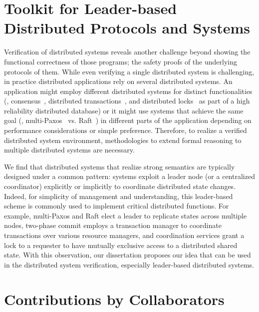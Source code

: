 \section{Toolkit for Leader-based Distributed Protocols and Systems}
\label{chapter:introduction:sec:toolkit-for-leader-based-distributed-protocols-and-systems}


Verification of distributed systems reveals another challenge beyond showing the functional correctness of those programs; the safety proofs of the underlying protocols of them. 
While even verifying a single distributed system is challenging, in practice
distributed applications rely on several distributed systems. An application
might employ different distributed systems for distinct functionalities (\eg,
consensus~\cite{vivaladifference}, distributed transactions~\cite{gray:2006},
and distributed locks~\cite{chubby, zookeeper} as part of a high reliability
distributed database) or it might use systems that achieve the same goal (\eg,
multi-Paxos~\cite{paxosmadesimple, rvrpaxos} vs. Raft~\cite{raft}) in different
parts of the application depending on performance considerations or simple
preference. Therefore, to realize a verified distributed system environment,
methodologies to extend formal reasoning to multiple distributed systems are
necessary.

We find that distributed systems that realize strong semantics are typically
designed under a common pattern: systems exploit a leader node
(or a centralized coordinator) explicitly or implicitly to coordinate
distributed state changes. Indeed, for simplicity of management and understanding, this leader-based scheme is commonly used to implement critical distributed functions. For example, multi-Paxos and Raft elect a leader to replicate states
across multiple nodes, two-phase commit employs a transaction manager to
coordinate transactions over various resource managers, and coordination
services grant a lock to a requester to have mutually exclusive access to a
distributed shared state.
With this observation, our dissertation proposes our idea that can be used in the distributed system verification,
especially leader-based distributed systems.

\section{Contributions by Collaborators}
\label{chapter:introduction:sec:contributions-by-collaborators}

